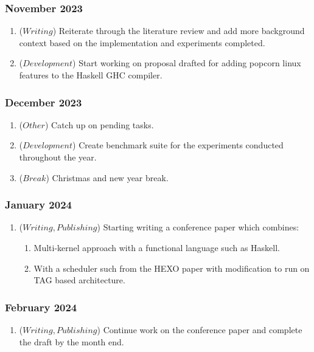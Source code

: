  \subsubsection{November 2023}
  \begin{enumerate}
    \item (\(Writing\)) Reiterate through the literature review and add more background context based on the implementation and experiments 
    completed.
    \item (\(Development\)) Start working on proposal drafted for adding popcorn linux features to the Haskell GHC compiler.
 \end{enumerate}

 \subsubsection{December 2023}
  \begin{enumerate}
    \item (\(Other\)) Catch up on pending tasks.
    \item (\(Development\)) Create benchmark suite for the experiments conducted throughout the year.
    \item (\(Break\)) Christmas and new year break.
 \end{enumerate}

 \subsubsection{January 2024}
  \begin{enumerate}
    \item (\(Writing, Publishing\)) Starting writing a conference paper which combines:
    \begin{enumerate}
        \item Multi-kernel approach with a functional language such as Haskell.
        \item With a scheduler such from the HEXO paper with modification to run on TAG based architecture. 
      \end{enumerate}
 \end{enumerate}

 \subsubsection{February 2024}
  \begin{enumerate}
    \item (\(Writing, Publishing\)) Continue work on the conference paper and complete the draft by the month end.
 \end{enumerate}

